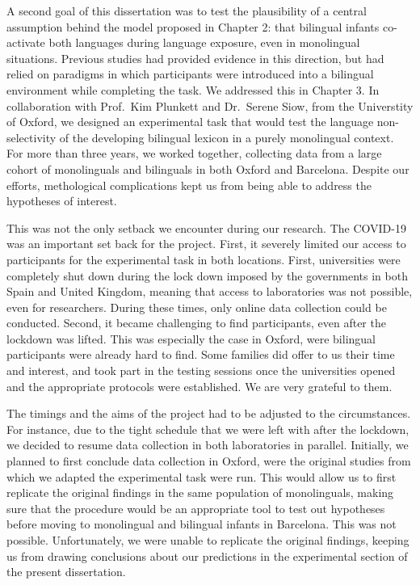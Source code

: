 \documentclass[
  12pt,
  b5paperpaper,
  twoside]{scrreprt}
\begin{document}
\begin{spacing}{1.5}
{A second goal of this dissertation was to test the plausibility of a
central assumption behind the model proposed in Chapter 2: that
bilingual infants co-activate both languages during language exposure,
even in monolingual situations. Previous studies had provided evidence
in this direction, but had relied on paradigms in which participants
were introduced into a bilingual environment while completing the task.
We addressed this in Chapter 3. In collaboration with Prof.~Kim Plunkett
and Dr.~Serene Siow, from the Universtity of Oxford, we designed an
experimental task that would test the language non-selectivity of the
developing bilingual lexicon in a purely monolingual context. For more
than three years, we worked together, collecting data from a large
cohort of monolinguals and bilinguals in both Oxford and Barcelona.
Despite our efforts, methological complications kept us from being able
to address the hypotheses of interest.

This was not the only setback we encounter during our research. The
COVID-19 was an important set back for the project. First, it severely
limited our access to participants for the experimental task in both
locations. First, universities were completely shut down during the lock
down imposed by the governments in both Spain and United Kingdom,
meaning that access to laboratories was not possible, even for
researchers. During these times, only online data collection could be
conducted. Second, it became challenging to find participants, even
after the lockdown was lifted. This was especially the case in Oxford,
were bilingual participants were already hard to find. Some families did
offer to us their time and interest, and took part in the testing
sessions once the universities opened and the appropriate protocols were
established. We are very grateful to them.

The timings and the aims of the project had to be adjusted to the
circumstances. For instance, due to the tight schedule that we were left
with after the lockdown, we decided to resume data collection in both
laboratories in parallel. Initially, we planned to first conclude data
collection in Oxford, were the original studies from which we adapted
the experimental task were run. This would allow us to first replicate
the original findings in the same population of monolinguals, making
sure that the procedure would be an appropriate tool to test out
hypotheses before moving to monolingual and bilingual infants in
Barcelona. This was not possible. Unfortunately, we were unable to
replicate the original findings, keeping us from drawing conclusions
about our predictions in the experimental section of the present
dissertation.

}
\end{spacing}
\end{document}

